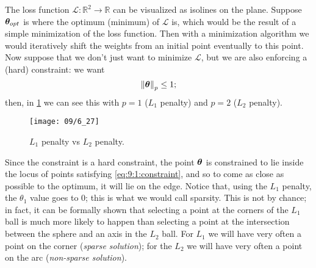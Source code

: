 The loss function $\mathcal{L}: \mathbb{R}^2 \to \mathbb{R}$ can be visualized as isolines on the plane. Suppose $\vb*{\theta}_{opt}$ is where the optimum (minimum) of $\mathcal{L}$ is, which would be the result of a simple minimization of the loss function. Then with a minimization algorithm we would iteratively shift the weights from an initial point eventually to this point. Now suppose that we don't just want to minimize $\mathcal{L}$, but we are also enforcing a (hard) constraint: we want 
\begin{equation}
    \norm{\vb*{\theta}}_p \leq 1;
    \label{eq:9:1:constraint}
\end{equation}
then, in \cref{fig:09:1:penalties} we can see this with $p = 1$ ($L_1$ penalty) and $p = 2$ ($L_2$ penalty). 
\begin{figure}[H]
    \centering
    \texttt{[image: 09/6\_27]}
    \caption{$L_1$ penalty vs $L_2$ penalty.}
    \label{fig:09:1:penalties}	
\end{figure}
Since the constraint is a hard constraint, the point $\vb*{\theta}$ is constrained to lie inside the locus of points satisfying \cref{eq:9:1:constraint}, and so to come as close as possible to the optimum, it will lie on the edge.
Notice that, using the $L_1$ penalty, the $\theta_1$ value goes to $0$; this is what we would call sparsity. This is not by chance; in fact, it can be formally shown that selecting a point at the corners of the $L_1$ ball is much more likely to happen than selecting a point at the intersection
between the sphere and an axis in the $L_2$ ball. For $L_1$ we will have very often a point on the corner (\emph{sparse solution}); for the $L_2$ we will have very often a point on the arc (\emph{non-sparse solution}).